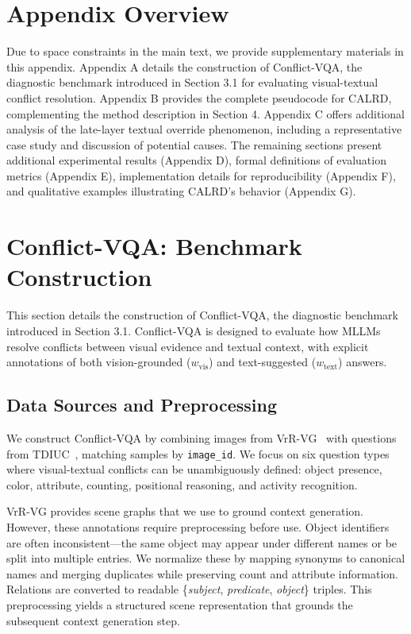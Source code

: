 \documentclass{article}
\newif\ifshowrevisions
\newenvironment{revised}{%
  \ifshowrevisions%
  \fi%
}{}
\begin{document}
\begin{revised}
    

\section*{Appendix Overview}


Due to space constraints in the main text, we provide supplementary materials in this appendix. Appendix A details the construction of Conflict-VQA, the diagnostic benchmark introduced in Section 3.1 for evaluating visual-textual conflict resolution. Appendix B provides the complete pseudocode for CALRD, complementing the method description in Section 4. Appendix C offers additional analysis of the late-layer textual override phenomenon, including a representative case study and discussion of potential causes. The remaining sections present additional experimental results (Appendix D), formal definitions of evaluation metrics (Appendix E), implementation details for reproducibility (Appendix F), and qualitative examples illustrating CALRD's behavior (Appendix G).


\section{Conflict-VQA: Benchmark Construction}
\label{sec:appendix_construction}

This section details the construction of Conflict-VQA, the diagnostic benchmark introduced in Section 3.1. Conflict-VQA is designed to evaluate how MLLMs resolve conflicts between visual evidence and textual context, with explicit annotations of both vision-grounded ($w_{\mathrm{vis}}$) and text-suggested ($w_{\mathrm{text}}$) answers.
\subsection{Data Sources and Preprocessing}


We construct Conflict-VQA by combining images from VrR-VG~\cite{VrR-VG2019} with questions from TDIUC~\cite{TD-IUC2017}, matching samples by \texttt{image\_id}. We focus on six question types where visual-textual conflicts can be unambiguously defined: object presence, color, attribute, counting, positional reasoning, and activity recognition.

VrR-VG provides scene graphs that we use to ground context generation. However, these annotations require preprocessing before use. Object identifiers are often inconsistent—the same object may appear under different names or be split into multiple entries. We normalize these by mapping synonyms to canonical names and merging duplicates while preserving count and attribute information. Relations are converted to readable \{\emph{subject}, \emph{predicate}, \emph{object}\} triples. This preprocessing yields a structured scene representation that grounds the subsequent context generation step.


\end{revised}
\end{document}
